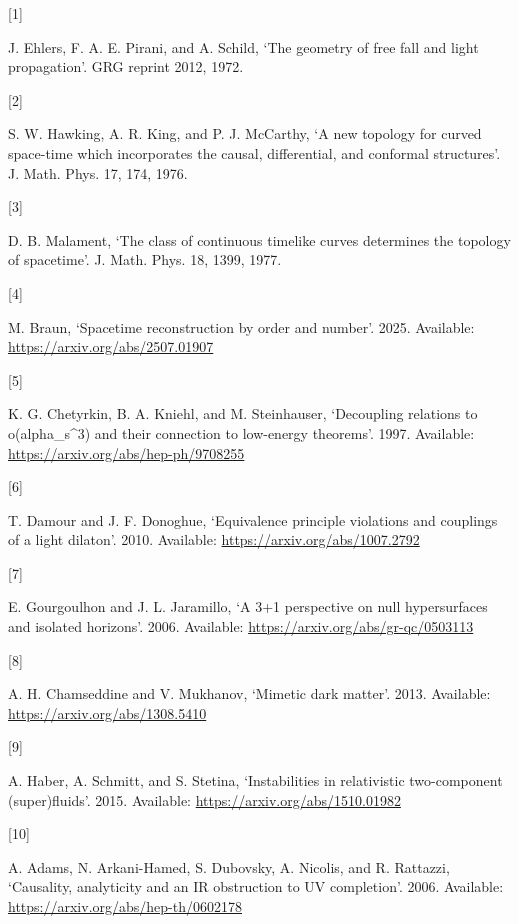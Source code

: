 \documentclass[
]{article}
\newlength{\cslhangindent}
\newlength{\csllabelwidth}
\newenvironment{CSLReferences}[2] %
 {\begin{list}{}{%
  \setlength{\itemindent}{0pt}
  \setlength{\leftmargin}{0pt}
  \setlength{\parsep}{0pt}
  \ifodd #1
   \setlength{\leftmargin}{\cslhangindent}
   \setlength{\itemindent}{-1\cslhangindent}
  \fi
  \setlength{\itemsep}{#2\baselineskip}}}
 {\end{list}}
\newcommand{\CSLLeftMargin}[1]{\parbox[t]{\csllabelwidth}{\strut#1\strut}}
\newcommand{\CSLRightInline}[1]{\parbox[t]{\linewidth - \csllabelwidth}{\strut#1\strut}}
\begin{document}
\label{refs}
\begin{CSLReferences}{0}{0}
\CSLLeftMargin{{[}1{]} }%
\CSLRightInline{J. Ehlers, F. A. E. Pirani, and A. Schild, {`The
geometry of free fall and light propagation'}. GRG reprint 2012, 1972.}

\CSLLeftMargin{{[}2{]} }%
\CSLRightInline{S. W. Hawking, A. R. King, and P. J. McCarthy, {`A new
topology for curved space-time which incorporates the causal,
differential, and conformal structures'}. J. Math. Phys. 17, 174, 1976.}

\CSLLeftMargin{{[}3{]} }%
\CSLRightInline{D. B. Malament, {`The class of continuous timelike
curves determines the topology of spacetime'}. J. Math. Phys. 18, 1399,
1977.}

\CSLLeftMargin{{[}4{]} }%
\CSLRightInline{M. Braun, {`Spacetime reconstruction by order and
number'}. 2025. Available: \url{https://arxiv.org/abs/2507.01907}}

\CSLLeftMargin{{[}5{]} }%
\CSLRightInline{K. G. Chetyrkin, B. A. Kniehl, and M. Steinhauser,
{`Decoupling relations to o(alpha\_s\^{}3) and their connection to
low-energy theorems'}. 1997. Available:
\url{https://arxiv.org/abs/hep-ph/9708255}}

\CSLLeftMargin{{[}6{]} }%
\CSLRightInline{T. Damour and J. F. Donoghue, {`Equivalence principle
violations and couplings of a light dilaton'}. 2010. Available:
\url{https://arxiv.org/abs/1007.2792}}

\CSLLeftMargin{{[}7{]} }%
\CSLRightInline{E. Gourgoulhon and J. L. Jaramillo, {`A 3+1 perspective
on null hypersurfaces and isolated horizons'}. 2006. Available:
\url{https://arxiv.org/abs/gr-qc/0503113}}

\CSLLeftMargin{{[}8{]} }%
\CSLRightInline{A. H. Chamseddine and V. Mukhanov, {`Mimetic dark
matter'}. 2013. Available: \url{https://arxiv.org/abs/1308.5410}}

\CSLLeftMargin{{[}9{]} }%
\CSLRightInline{A. Haber, A. Schmitt, and S. Stetina, {`Instabilities in
relativistic two-component (super)fluids'}. 2015. Available:
\url{https://arxiv.org/abs/1510.01982}}

\CSLLeftMargin{{[}10{]} }%
\CSLRightInline{A. Adams, N. Arkani-Hamed, S. Dubovsky, A. Nicolis, and
R. Rattazzi, {`Causality, analyticity and an IR obstruction to UV
completion'}. 2006. Available:
\url{https://arxiv.org/abs/hep-th/0602178}}


\end{CSLReferences}
\end{document}
